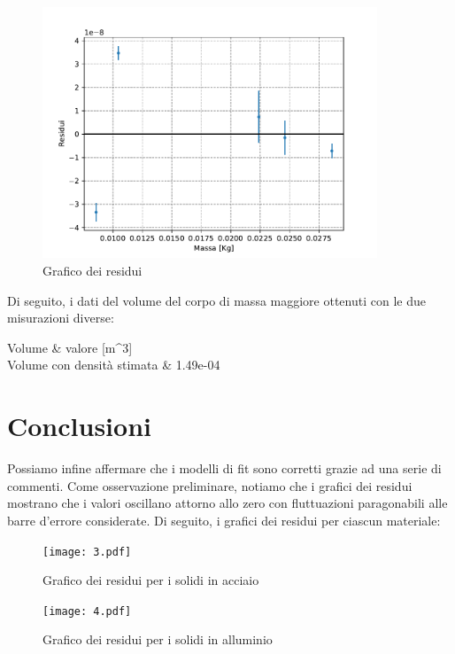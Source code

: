 \documentclass{article}
\begin{document}
\begin{enumerate}
\begin{figure}
    \centering
    \includegraphics[width=10cm]{residui.pdf}
    \caption{Grafico dei residui}
    \label{fig:my_label}
\end{figure}

Di seguito, i dati del volume del corpo di massa maggiore ottenuti con le due misurazioni diverse:

\begin{tabular}
    \toprule
    Volume & valore [m^3]\\
    \midrule
    Volume con densità stimata & 1.49e-04\\
\end{tabular}

\FloatBarrier

\vspace{1em}

\section{Conclusioni} 
Possiamo infine affermare che i modelli di fit sono corretti grazie ad una serie di commenti. Come osservazione preliminare, notiamo che i grafici dei residui mostrano che i valori oscillano attorno allo zero con fluttuazioni paragonabili alle barre d'errore considerate. Di seguito, i grafici dei residui per ciascun materiale:


\begin{figure}
    \centering
    \texttt{[image: 3.pdf]}
    \caption{Grafico dei residui per i solidi in acciaio}
    \label{fig:my_label}
\end{figure}

\begin{figure}
    \centering
    \texttt{[image: 4.pdf]}
    \caption{Grafico dei residui per i solidi in alluminio}
    \label{fig:my_label}
\end{figure}


\end{enumerate}
\end{document}

